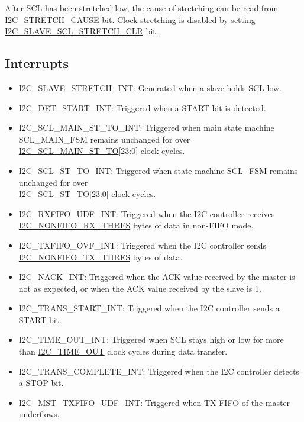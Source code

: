 \documentclass[main\_\_EN.tex]{subfiles}
\begin{document}
After SCL has been stretched low, the cause of stretching can be read from \hyperref[fielddesc:I2CSTRETCHCAUSE]{I2C\_STRETCH\_CAUSE} bit. Clock stretching is disabled by setting \hyperref[fielddesc:I2CSLAVESCLSTRETCHCLR]{I2C\_SLAVE\_SCL\_STRETCH\_CLR} bit.

\subsection{Interrupts}\label{5.3.7}
\begin{itemize}
\item \label{I2CEXTSLAVESTRETCHINT}I2C\_SLAVE\_STRETCH\_INT: Generated when a slave holds SCL low.
\item \label{I2CEXTDETSTARINT}I2C\_DET\_START\_INT: Triggered when a START bit is detected.
\item \label{I2CEXTSCLMAINSTTOINT}I2C\_SCL\_MAIN\_ST\_TO\_INT: Triggered when main state machine SCL\_MAIN\_FSM remains unchanged for over \hyperref[fielddesc:I2CSCLMAINSTTO]{I2C\_SCL\_MAIN\_ST\_TO}[23:0] clock cycles.
\item \label{I2CEXTSCLSTTOINT}I2C\_SCL\_ST\_TO\_INT: Triggered when state machine SCL\_FSM remains unchanged for over \\\hyperref[fielddesc:I2CSCLSTTO]{I2C\_SCL\_ST\_TO}[23:0] clock cycles.
\item \label{int:I2CEXTRXFIFOUDFINT}I2C\_RXFIFO\_UDF\_INT: Triggered when the I2C controller receives \hyperref[fielddesc:I2CNONFIFORXTHRES]{I2C\_NONFIFO\_RX\_THRES} bytes of data in non-FIFO mode.
\item \label{int:I2CEXTTXFIFOOVFINT}I2C\_TXFIFO\_OVF\_INT: Triggered when the I2C controller sends \hyperref[fielddesc:I2CNONFIFOTXTHRES]{I2C\_NONFIFO\_TX\_THRES} bytes of data.
\item \label{int:I2CEXTNACKINT}I2C\_NACK\_INT: Triggered when the ACK value received by the master is not as expected, or when the ACK value received by the slave is 1.
\item \label{int:I2CEXTTRANSSTARTINT}I2C\_TRANS\_START\_INT: Triggered when the I2C controller sends a START bit.
\item \label{int:I2CEXTTIMEOUTINT}I2C\_TIME\_OUT\_INT: Triggered when SCL stays high or low for more than \hyperref[fielddesc:I2CTIMEOUT]{I2C\_TIME\_OUT} clock cycles during data transfer.
\item \label{int:I2CEXTTRANSCOMPLETEINT}I2C\_TRANS\_COMPLETE\_INT: Triggered when the I2C controller detects a STOP bit.
\item \label{int:I2CEXTMSTTXFIFOUDFINT}I2C\_MST\_TXFIFO\_UDF\_INT: Triggered when TX FIFO of the master underflows.

\end{itemize}
\end{document}
